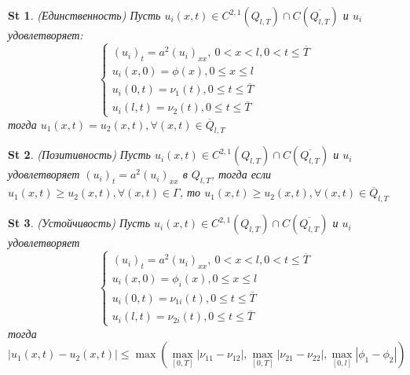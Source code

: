 \documentclass[14pt]{article}
\theoremstyle{plain}
\newtheorem{St}{St}
\theoremstyle{definition}
\begin{document}
		\begin{St}
			 (Единственность) \newline
			 Пусть $u_i(x,t) \in C^{2,1} (Q_{l, T}) \cap C(\overline{Q_{l,T}})$ и $u_i$ удовлетворяет:
			 		\begin{equation*}
			 	\left\{ 
			 	\begin{array}{ll} 
			 		(u_i)_t = a^2 (u_i)_{xx}, \ 0 < x < l, 0 < t \leq \overline{T} \\
			 		u_i(x,0) = \phi(x), 0 \leq x \leq l  \\
			 		u_i(0,t) = \nu_1(t),  0 \leq t \leq \overline{T} \\
			 		u_i(l,t) = \nu_2(t), 0 \leq t \leq \overline{T} \end{array}\right.
			 \end{equation*}
		  тогда $u_1(x,t) = u_2(x,t), \forall (x,t) \in \overline{Q}_{l, T}$
		\end{St}
		\begin{St}
				(Позитивность) \newline
				Пусть 	$u_i(x,t) \in C^{2,1} (Q_{l, T}) \cap C(\overline{Q_{l,T}})$ и $u_i$ удовлетворяет $(u_i)_t = a^2 (u_i)_{xx}$ в $Q_{l,T}$, тогда если $u_1(x,t) \geq u_2(x,t), \forall (x,t) \in \Gamma$, то $u_1(x,t) \geq u_2(x,t), \forall (x,t) \in \overline{Q}_{l, T}$
		\end{St}
		\begin{St}
			(Устойчивость) \newline
			Пусть 	$u_i(x,t) \in C^{2,1} (Q_{l, T}) \cap C(\overline{Q_{l,T}})$ и $u_i$ удовлетворяет
					\begin{equation*}
					\left\{ 
					\begin{array}{ll} 
						(u_i)_t = a^2 (u_i)_{xx}, \ 0 < x < l, 0 < t \leq \overline{T} \\
						u_i(x,0) = \phi_i(x), 0 \leq x \leq l  \\
						u_i(0,t) = \nu_{1i}(t),  0 \leq t \leq \overline{T} \\
						u_i(l,t) = \nu_{2i}(t), 0 \leq t \leq \overline{T} \end{array}\right.
				\end{equation*}
			тогда  $|u_1(x,t) - u_2(x,t)| \leq \max{ \left( \max\limits_{[0,T]}{|\nu_{11} - \nu_{12}|}, \max\limits_{[0,T]}{|\nu_{21} - \nu_{22}|}, \max\limits_{[0,l]}{|\phi_1 - \phi_2|}\right)}$
		\end{St}
\end{document}
